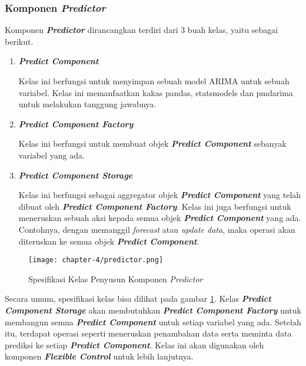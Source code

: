 \subsubsection{Komponen \textbf{\textit{Predictor}}}
Komponen \textbf{\textit{Predictor}} dirancangkan terdiri dari 3 buah kelas, yaitu sebagai berikut.
\begin{enumerate}
    \item \textbf{\textit{Predict Component}}
    
    Kelas ini berfungsi untuk menyimpan sebuah model ARIMA untuk sebuah variabel. Kelas ini memanfaatkan kakas pandas, statsmodels dan pmdarima untuk melakukan tanggung jawabnya.

    \item \textbf{\textit{Predict Component Factory}}
    
    Kelas ini berfungsi untuk membuat objek \textbf{\textit{Predict Component}} sebanyak variabel yang ada. 

    \item \textbf{\textit{Predict Component Storage}}
    
    Kelas ini berfungsi sebagai aggregator objek \textbf{\textit{Predict Component}} yang telah dibuat oleh \textbf{\textit{Predict Component Factory}}. Kelas ini juga berfungsi untuk meneruskan sebuah aksi kepada semua objek \textbf{\textit{Predict Component}} yang ada. Contohnya, dengan memanggil \textit{forecast} atau \textit{update data}, maka operasi akan diteruskan ke semua objek \textbf{\textit{Predict Component}}.

\end{enumerate}

\begin{figure}[h]
    \centering
    \texttt{[image: chapter-4/predictor.png]}
    \caption{Spesifikasi Kelas Penyusun Komponen \textit{Predictor}}
    \label{fig:predictor-spek}
\end{figure}

Secara umum, spesifikasi kelas bisa dilihat pada gambar \ref{fig:predictor-spek}. Kelas \textbf{\textit{Predict Component Storage}} akan membutuhkan \textbf{\textit{Predict Component Factory}} untuk membangun semua \textbf{\textit{Predict Component}} untuk setiap variabel yang ada. Setelah itu, terdapat operasi seperti meneruskan penambahan data serta meminta data prediksi ke setiap \textbf{\textit{Predict Component}}. Kelas ini akan digunakan oleh komponen \textbf{\textit{Flexible Control}} untuk lebih lanjutnya.